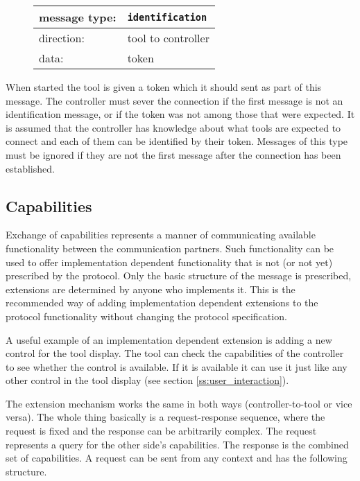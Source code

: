 \documentclass{article}
\newcommand{\msg}[1]{\texttt{#1}}
\begin{document}
   \begin{figure}[H]
    \begin{center}
     \begin{tabular}{|ll|}
      \hline
      message type:    & \msg{identification} \\
      \hline
      direction:       & tool to controller \\
      data:            & token \\
      \hline
     \end{tabular}
    \end{center}
   \end{figure}

   \noindent When started the tool is given a token which it should sent as
   part of this message. The controller must sever the connection if the first
   message is not an identification message, or if the token was not among
   those that were expected. It is assumed that the controller has knowledge
   about what tools are expected to connect and each of them can be identified
   by their token.  Messages of this type must be ignored if they are not the
   first message after the connection has been established.

  \subsection{Capabilities}

   Exchange of capabilities represents a manner of communicating available
   functionality between the communication partners.  Such functionality can be
   used to offer implementation dependent functionality that is not (or not
   yet) prescribed by the protocol. Only the basic structure of the message is
   prescribed, extensions are determined by anyone who implements it. This is the
   recommended way of adding implementation dependent extensions to the
   protocol functionality without changing the protocol specification.

   A useful example of an implementation dependent extension is adding a new
   control for the tool display. The tool can check the capabilities of the
   controller to see whether the control is available. If it is available it
   can use it just like any other control in the tool display (see section
   \ref{ss:user_interaction}).

   The extension mechanism works the same in both ways (controller-to-tool or
   vice versa). The whole thing basically is a request-response sequence,
   where the request is fixed and the response can be arbitrarily complex. The
   request represents a query for the other side's capabilities. The response
   is the combined set of capabilities. A request can be sent from any context
   and has the following structure.
\end{document}
